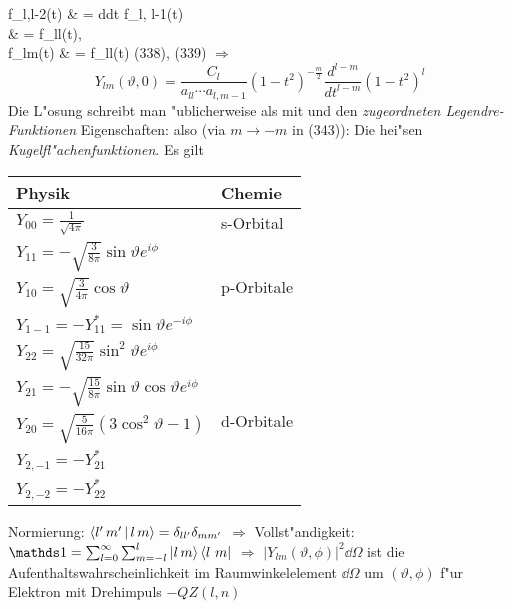 \documentclass[a4paper]{scrartcl}
\begin{document}
{{f_{l,l-2}(t) & =  \frac d{dt} f_{l, l-1}(t) \notag \\
& =    f_{ll}(t), \notag \\
f_{lm}(t) & =   f_{ll}(t) \notag
}
(338), (339) $\Longrightarrow$
$$Y_{lm}(\vartheta, 0) = \frac{C_l}{a_{ll} \cdots a_{l, m-1}} (1-t^2)^{- \frac m2 } \frac{d^{l-m}}{dt^{l-m}} (1-t^2)^l$$
Die L"osung schreibt man "ublicherweise als
mit
und den \emph{zugeordneten Legendre-Funktionen}
Eigenschaften:
also (via $m \longrightarrow -m$ in (343)):
Die 
hei"sen \emph{Kugelfl"achenfunktionen}. Es gilt

\begin{center}
\begin{tabular}{l l }
Physik & Chemie \\
\hline 
$Y_{00} = \frac1{\sqrt{4\pi}}$ & s-Orbital \\
\hline
$Y_{11} = -\sqrt{ \frac 3{8 \pi}} \sin \vartheta e^{i \phi}$ & \multirow{3}{*}{p-Orbitale} \\
$Y_{10} = \sqrt{ \frac 3 {4\pi}} \cos \vartheta$ \\
$Y_{1-1} = -Y_{11}^* = \sin \vartheta e^{- i \phi}$ \\
\hline
$Y_{22} = \sqrt{ \frac {15}{32 \pi}} \sin^2 \vartheta e^{i \phi}$ & \multirow{5}{*}{d-Orbitale} \\
$Y_{21} = -\sqrt{ \frac{15}{8 \pi}} \sin \vartheta \cos \vartheta e^{i \phi}$ \\
$Y_{20} = \sqrt{\frac5{16 \pi}} (3 \cos^2 \vartheta - 1)$ \\
$Y_{2,- 1} = - Y_{21}^*$ \\
$Y_{2, -2} = - Y_{22}^*$
\end{tabular}
\end{center}
Normierung: $\Braket{ l' \, m' | l \, m} = \delta_{l l'} \delta_{m m '}$ $\Longrightarrow$
Vollst"andigkeit: $\dOne = \sum_{l=0}^\infty \sum_{m=-l}^l \Ket{ l \, m} \Bra{l \ m}$ $\Longrightarrow$
$\vert Y_{lm}(\vartheta, \phi) \vert^2 \dd \Omega$ ist die Aufenthaltswahrscheinlichkeit im Raumwinkelelement $\dd \Omega$ um $(\vartheta, \phi)$ f"ur Elektron mit Drehimpuls $-QZ(l,n)$

}
\end{document}
